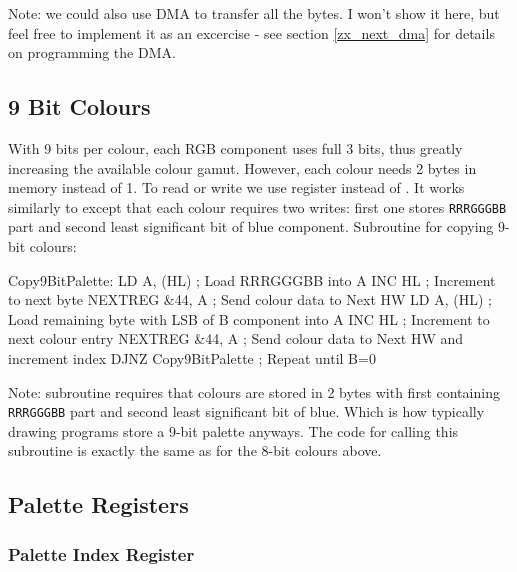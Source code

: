 Note: we could also use DMA to transfer all the bytes. I won't show it here, but feel free to implement it as an excercise - see section \ref{zx_next_dma} for details on programming the DMA.


\subsection{9 Bit Colours}

With 9 bits per colour, each RGB component uses full 3 bits, thus greatly increasing the available colour gamut. However, each colour needs 2 bytes in memory instead of 1. To read or write we use  register instead of . It works similarly to  except that each colour requires two writes: first one stores {\tt RRRGGGBB} part and second least significant bit of blue component. Subroutine for copying 9-bit colours:

\begin{tcblisting}{}
Copy9BitPalette:
	LD A, (HL)                ; Load RRRGGGBB into A
	INC HL                    ; Increment to next byte
	NEXTREG &44, A            ; Send colour data to Next HW
	LD A, (HL)                ; Load remaining byte with LSB of B component into A
	INC HL                    ; Increment to next colour entry
	NEXTREG &44, A            ; Send colour data to Next HW and increment index
	DJNZ Copy9BitPalette      ; Repeat until B=0
\end{tcblisting}

Note: subroutine requires that colours are stored in 2 bytes with first containing {\tt RRRGGGBB} part and second least significant bit of blue. Which is how typically drawing programs store a 9-bit palette anyways. The code for calling this subroutine is exactly the same as for the 8-bit colours above.


\subsection{Palette Registers}
\label{zx_next_palette_registers}

\subsubsection{Palette Index Register }

\begin{NextPort}
\end{NextPort}

